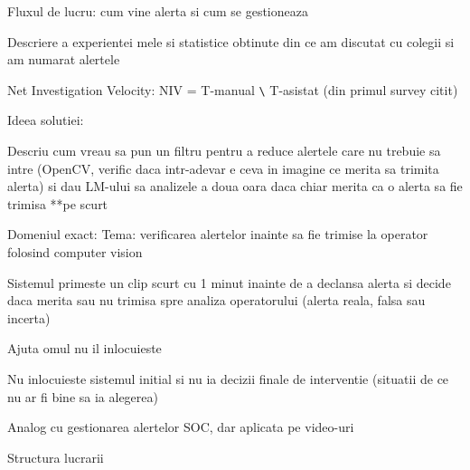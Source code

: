 Fluxul de lucru: cum vine alerta si cum se gestioneaza

Descriere a experientei mele si statistice obtinute din ce am
discutat cu colegii si am numarat alertele

Net Investigation Velocity: NIV = T-manual \verb|\| T-asistat
(din primul survey citit)

Ideea solutiei:

Descriu cum vreau sa pun un filtru pentru a reduce 
alertele care nu trebuie sa intre (OpenCV, verific daca intr-adevar
e ceva in imagine ce merita sa trimita alerta) si 
dau LM-ului sa analizele a doua oara daca chiar merita 
ca o alerta sa fie trimisa **pe scurt

Domeniul exact:
Tema: verificarea alertelor inainte sa fie trimise la operator
folosind computer vision

Sistemul primeste un clip scurt cu 1 minut inainte de a declansa
alerta si decide daca merita sau nu trimisa spre analiza
operatorului (alerta reala, falsa sau incerta)

Ajuta omul nu il inlocuieste

Nu inlocuieste sistemul initial si nu ia decizii finale de 
interventie (situatii de ce nu ar fi bine sa ia alegerea)

Analog cu gestionarea alertelor SOC, dar aplicata pe video-uri

Structura lucrarii

